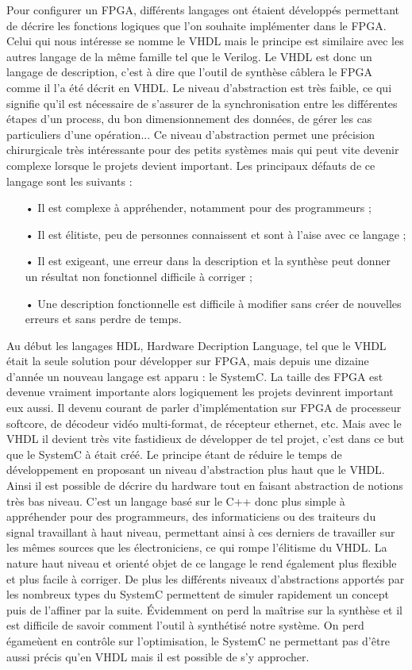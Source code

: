 \documentclass[a4paper,12pt]{article}
\begin{document}
Pour configurer un FPGA, différents langages ont étaient développés permettant de décrire les fonctions logiques que l'on souhaite implémenter dans le FPGA. Celui qui nous intéresse se nomme le VHDL mais le principe est similaire avec les autres langage de la même famille tel que le Verilog. Le VHDL est donc un langage de description, c'est à dire que l'outil de synthèse câblera le FPGA comme il l'a été décrit en VHDL. Le niveau d'abstraction est très faible, ce qui signifie qu'il est nécessaire de s'assurer de la synchronisation entre les différentes étapes d'un process, du bon dimensionnement des données, de gérer les cas particuliers d'une opération... Ce niveau d'abstraction permet une précision chirurgicale très intéressante pour des petits systèmes mais qui peut vite devenir complexe lorsque le projets devient important. Les principaux défauts de ce langage sont les suivants :\\ 

\begin{itemize}
\item[•] Il est complexe à appréhender, notamment pour des programmeurs ;
\item[•] Il est élitiste, peu de personnes connaissent et sont à l'aise avec ce langage ;
\item[•] Il est exigeant, une erreur dans la description et la synthèse peut donner un résultat non fonctionnel difficile à corriger ;
\item[•] Une description fonctionnelle est difficile à modifier sans créer de nouvelles erreurs et sans perdre de temps.
\end{itemize}

Au début les langages HDL, Hardware Decription Language, tel que le VHDL était la seule solution pour développer sur FPGA, mais depuis une dizaine d'année un nouveau langage est apparu : le SystemC. La taille des FPGA est devenue vraiment importante alors logiquement les projets devinrent important eux aussi. Il devenu courant de parler d'implémentation sur FPGA de processeur softcore, de décodeur vidéo multi-format, de récepteur ethernet, etc. Mais avec le VHDL il devient très vite fastidieux de développer de tel projet, c'est dans ce but que le SystemC à était créé. Le principe étant de réduire le temps de développement en proposant un niveau d'abstraction plus haut que le VHDL. Ainsi il est possible de décrire du hardware tout en faisant abstraction de notions très bas niveau. C'est un langage basé sur le C++ donc plus simple à appréhender pour des programmeurs, des informaticiens ou des traiteurs du signal travaillant à haut niveau, permettant ainsi à ces derniers de travailler sur les mêmes sources que les électroniciens, ce qui rompe l'élitisme du VHDL. La nature haut niveau et orienté objet de ce langage le rend également plus flexible et plus facile à corriger. De plus les différents niveaux d'abstractions apportés par les nombreux types du SystemC permettent de simuler rapidement un concept puis de l'affiner par la suite. Évidemment on perd la maîtrise sur la synthèse et il est difficile de savoir comment l'outil à synthétisé notre système. On perd égameùent en contrôle sur l'optimisation, le SystemC ne permettant pas d'être aussi précis qu'en VHDL mais il est possible de s'y approcher. 
\end{document}
